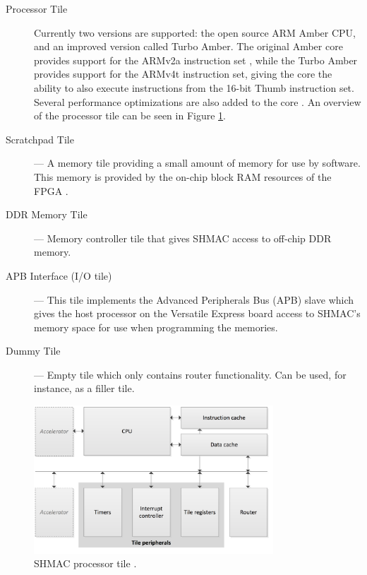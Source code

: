 \begin{description}
  \item[Processor Tile] Currently two versions are supported: the open source ARM Amber CPU, and an improved version called Turbo Amber.
  	The original Amber core provides support for the ARMv2a instruction set \cite{amber-spec}, while the Turbo Amber
	provides support for the ARMv4t instruction set, giving the core the ability to also execute
	instructions from the 16-bit Thumb instruction set. Several performance optimizations are
	also added to the core \cite{turboamber}. An overview of the processor tile can be seen in
	Figure \ref{fig:shmac-cpu}.
  \item[Scratchpad Tile] --- A memory tile providing a small amount of memory for use by software.
  	This memory is provided by the on-chip block RAM resources of the FPGA \cite{shmac-plan}.
  \item[DDR Memory Tile] --- Memory controller tile that gives SHMAC access to off-chip DDR memory.
  \item[APB Interface (I/O tile)] --- This tile implements the Advanced Peripherals Bus (APB) slave
  	which gives the host processor on the Versatile Express board access to SHMAC's memory space
	for use when programming the memories. \cite{shmac-plan}
  \item[Dummy Tile] --- Empty tile which only contains router functionality. Can be used, for instance,
  	as a filler tile. \cite{shmac-plan}
\end{description}

\begin{figure}[htb]
    \centering
    \includegraphics[width=0.8\textwidth]{Figures/Heterogeneous/SHMACCPU}
    \caption{SHMAC processor tile \cite{shmac-plan}.}
    \label{fig:shmac-cpu}
\end{figure}

